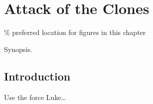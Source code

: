 \chapter{Attack of the Clones}\label{chapter:attack-of-the-clones}

\% preferred location for figures in this chapter

\begin{synopsis}

Synopsis.

\end{synopsis}

\section{Introduction}\label{introduction}

Use the force Luke\ldots{}
